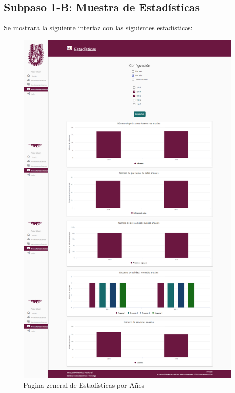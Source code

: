 \subsection{Subpaso 1-B: Muestra de Estadísticas}
	Se mostrará la siguiente interfaz con las siguientes estadísticas:
	\begin{figure}[hbtp]
		\includegraphics[scale=0.3]{images/Interfaz/IUGS15_estadisticasAnos.PNG}
		\caption{Pagina general de Estadísticas por Años}
	\end{figure}	
	
